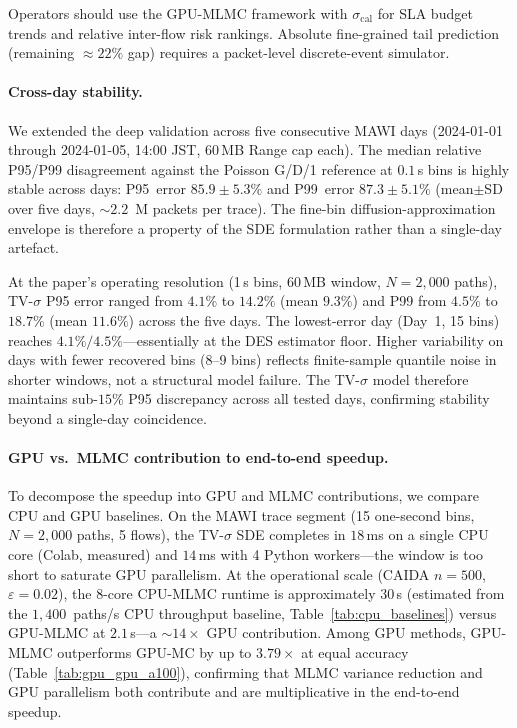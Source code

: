 \documentclass{ieeeaccess}
\begin{document}
Operators should use the GPU-MLMC framework with $\sigma_{\mathrm{cal}}$ for SLA budget trends
and relative inter-flow risk rankings. Absolute fine-grained tail prediction (remaining
$\approx\!22\%$ gap) requires a packet-level discrete-event simulator.

\paragraph{Cross-day stability.}
We extended the deep validation across five consecutive MAWI days (2024-01-01 through 2024-01-05,
14:00 JST, 60\,MB Range cap each). The median relative P95/P99 disagreement against the Poisson
G/D/1 reference at $0.1$\,s bins is highly stable across days: P95~error $85.9\!\pm\!5.3\%$ and
P99~error $87.3\!\pm\!5.1\%$ (mean$\pm$SD over five days, $\sim\!2.2$~M packets per trace). The
fine-bin diffusion-approximation envelope is therefore a property of the SDE formulation rather
than a single-day artefact.

At the paper's operating resolution (1\,s bins, 60\,MB window, $N{=}2{,}000$ paths),
TV-$\sigma$ P95 error ranged from $4.1\%$ to $14.2\%$ (mean $9.3\%$) and P99 from $4.5\%$ to
$18.7\%$ (mean $11.6\%$) across the five days. The lowest-error day (Day~1, 15 bins) reaches
$4.1\%/4.5\%$---essentially at the DES estimator floor. Higher variability on days with fewer
recovered bins (8--9 bins) reflects finite-sample quantile noise in shorter windows, not a
structural model failure. The TV-$\sigma$ model therefore maintains sub-$15\%$ P95 discrepancy
across all tested days, confirming stability beyond a single-day coincidence.

\paragraph{GPU vs.\ MLMC contribution to end-to-end speedup.}
To decompose the speedup into GPU and MLMC contributions, we compare CPU and GPU baselines. On
the MAWI trace segment (15 one-second bins, $N{=}2{,}000$ paths, 5 flows), the TV-$\sigma$ SDE
completes in $18$\,ms on a single CPU core (Colab, measured) and $14$\,ms with 4 Python
workers---the window is too short to saturate GPU parallelism.
At the operational scale (CAIDA $n{=}500$, $\varepsilon{=}0.02$), the 8-core CPU-MLMC runtime is
approximately $30$\,s (estimated from the $1{,}400$~paths/s CPU throughput baseline,
Table~\ref{tab:cpu_baselines}) versus GPU-MLMC at $2.1$\,s---a $\sim\!14\times$ GPU contribution.
Among GPU methods, GPU-MLMC outperforms GPU-MC by up to $3.79\times$ at equal accuracy
(Table~\ref{tab:gpu_gpu_a100}), confirming that MLMC variance reduction and GPU parallelism both
contribute and are multiplicative in the end-to-end speedup.
\end{document}
